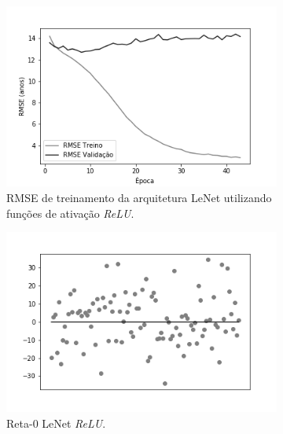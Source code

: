 \begin{figure}[hb!]
	\caption{Resultados do treinamento e teste da CNN LeNet.}\label{fig:lenet-abordagem1}
  \begin{subfigure}[hb]{0.5\linewidth}
    \caption{RMSE de treinamento da arquitetura LeNet utilizando funções de ativação \emph{ReLU}.}
    \label{fig:redeneuralbiologica}
    \includegraphics[width=\linewidth]{img/graficos-fase2/fig-history-lenet-relu-data-augmentation-2-1.png}%
  \end{subfigure}%
	\begin{subfigure}[hb]{0.5\linewidth}
		\caption{Reta-0 LeNet \emph{ReLU}.}
		\label{fig:redeneuralbiologica}
		\includegraphics[width=\linewidth]{img/graficos-fase2/fig-reta-0-lenetregressor-relu-data-augmentation-2-1.png}%
	\end{subfigure}\\
  \begin{subfigure}[hb]{0.5\linewidth}

\end{subfigure}
\end{figure}
